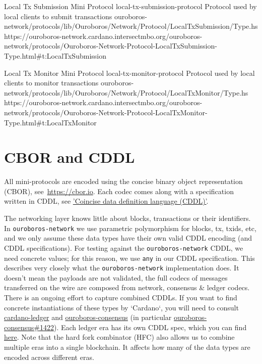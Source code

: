 \miniEntry
    {Local Tx Submission Mini Protocol}
    {local-tx-submission-protocol}
    {Protocol used by local clients to submit transactions}
    {ouroboros-network/protocols/lib/Ouroboros/Network/Protocol/LocalTxSubmission/Type.hs}
    {https://ouroboros-network.cardano.intersectmbo.org/ouroboros-network/protocols/Ouroboros-Network-Protocol-LocalTxSubmission-Type.html\#t:LocalTxSubmission}

\miniEntry
    {Local Tx Monitor Mini Protocol}
    {local-tx-monitor-protocol}
    {Protocol used by local clients to monitor transactions}
    {ouroboros-network/protocols/lib/Ouroboros/Network/Protocol/LocalTxMonitor/Type.hs}
    {https://ouroboros-network.cardano.intersectmbo.org/ouroboros-network/protocols/Ouroboros-Network-Protocol-LocalTxMonitor-Type.html\#t:LocalTxMonitor}


\section{CBOR and CDDL}
All mini-protocols are encoded using the concise binary object representation
(CBOR), see~\url{https://cbor.io}.  Each codec comes along with a specification
written in CDDL,
see \href{https://cbor-wg.github.io/cddl/draft-ietf-cbor-cddl.html}{'Coincise
data definition language (CDDL)'}.

The networking layer knows little about blocks, transactions or
their identifiers.  In \texttt{ouroboros-network} we use parametric
polymorphism for blocks, tx, txids, etc, and we only assume these data types have their own valid CDDL
encoding (and CDDL specifications).  For testing against the \texttt{ouroboros-network} CDDL, we need
concrete values; for this reason, we use \texttt{any} in our CDDL specification.
This describes very closely what the \texttt{ouroboros-network} implementation
does.  It doesn't mean the payloads are not validated, the full codecs of
messages transferred on the wire are composed from network, consensus \& ledger
codecs.   There is an ongoing effort to capture combined CDDLs.  If you want to
find concrete instantiations of these types by `Cardano`, you will need to
consult
\href{https://github.com/intersectmbo/cardano-ledger}{cardano-ledger} and
\href{https://github.com/intersectmbo/ouroboros-consensus}{ouroboros-consensus} (in particular \href{https://github.com/IntersectMBO/ouroboros-consensus/pull/1422}{ouroboros-consensus\#1422}).
Each ledger era has its own CDDL spec, which you can find
\href{https://github.com/intersectmbo/cardano-ledger#cardano-ledger}{here}.
Note that the hard fork combinator (HFC) also allows us to
combine multiple eras into a single blockchain.  It affects how many of the
data types are encoded across different eras.

